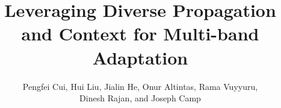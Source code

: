 \documentclass[a4paper,12pt]{article}
\begin{document}
\title{Leveraging Diverse Propagation and Context for Multi-band Adaptation}
\author{Pengfei Cui, Hui Liu, Jialin He, Onur Altintas, Rama Vuyyuru, \\
Dinesh Rajan, and Joseph Camp\\ 
}





\maketitle








%
%
%
%
%
%


%

%
\end{document}
